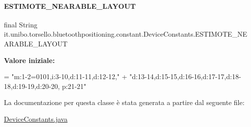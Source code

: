 \paragraph{\texorpdfstring{E\+S\+T\+I\+M\+O\+T\+E\+\_\+\+N\+E\+A\+R\+A\+B\+L\+E\+\_\+\+L\+A\+Y\+O\+UT}{ESTIMOTE\_NEARABLE\_LAYOUT}}
{\footnotesize\ttfamily final String it.\+unibo.\+torsello.\+bluetoothpositioning.\+constant.\+Device\+Constants.\+E\+S\+T\+I\+M\+O\+T\+E\+\_\+\+N\+E\+A\+R\+A\+B\+L\+E\+\_\+\+L\+A\+Y\+O\+UT\hspace{0.3cm}{\ttfamily [static]}}

{\bfseries Valore iniziale\+:}
\begin{DoxyCode}
= \textcolor{stringliteral}{"m:1-2=0101,i:3-10,d:11-11,d:12-12,"} +
            \textcolor{stringliteral}{"d:13-14,d:15-15,d:16-16,d:17-17,d:18-18,d:19-19,d:20-20, p:21-21"}
\end{DoxyCode}


La documentazione per questa classe è stata generata a partire dal seguente file\+:\begin{DoxyCompactItemize}
\item 
\hyperlink{DeviceConstants_8java}{Device\+Constants.\+java}\end{DoxyCompactItemize}
